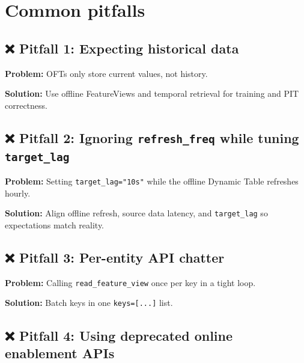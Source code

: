 \documentclass[
  letterpaper,
  DIV=11,
  numbers=noendperiod]{scrreprt}
\begin{document}
\hypertarget{common-pitfalls-6}{%
\section{Common pitfalls}\label{common-pitfalls-6}}

\hypertarget{pitfall-1-expecting-historical-data}{%
\subsection{❌ Pitfall 1: Expecting historical
data}\label{pitfall-1-expecting-historical-data}}

\textbf{Problem:} OFTs only store current values, not history.

\textbf{Solution:} Use offline FeatureViews and temporal retrieval for
training and PIT correctness.

\hypertarget{pitfall-2-ignoring-refresh_freq-while-tuning-target_lag}{%
\subsection{\texorpdfstring{❌ Pitfall 2: Ignoring
\texttt{refresh\_freq} while tuning
\texttt{target\_lag}}{❌ Pitfall 2: Ignoring refresh\_freq while tuning target\_lag}}\label{pitfall-2-ignoring-refresh_freq-while-tuning-target_lag}}

\textbf{Problem:} Setting \texttt{target\_lag="10s"} while the offline
Dynamic Table refreshes hourly.

\textbf{Solution:} Align offline refresh, source data latency, and
\texttt{target\_lag} so expectations match reality.

\hypertarget{pitfall-3-per-entity-api-chatter}{%
\subsection{❌ Pitfall 3: Per-entity API
chatter}\label{pitfall-3-per-entity-api-chatter}}

\textbf{Problem:} Calling \texttt{read\_feature\_view} once per key in a
tight loop.

\textbf{Solution:} Batch keys in one \texttt{keys={[}...{]}} list.

\hypertarget{pitfall-4-using-deprecated-online-enablement-apis}{%
\subsection{❌ Pitfall 4: Using deprecated online enablement
APIs}\label{pitfall-4-using-deprecated-online-enablement-apis}}
\end{document}
